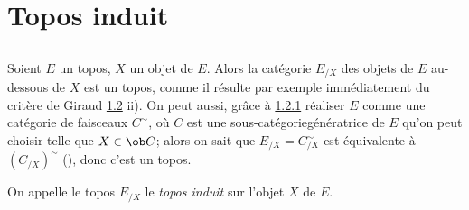 \documentclass[10pt]{../fichiers-configuration-latex/smfart}
\begin{document}
\section{Topos induit}

\subsection{}
Soient $E$ un topos, $X$ un objet de $E$. Alors la catégorie
$E_{/X}$ des objets de $E$ au-dessous de $X$ est un topos, comme il
résulte par exemple immédiatement du critère de Giraud
\hyperref[IV.theo1.2]{1.2} ii). On peut aussi, grâce à \hyperref[IV.cor1.2.1]{1.2.1}
réaliser $E$ comme une catégorie de faisceaux $C^{\sim}$, où
$C$ est une sous-catégorie\pageoriginale génératrice de $E$
qu'on peut choisir telle que $X\in \ob C$; alors on sait que
$E_{/X}=C^{\sim}_{/X}$ est équivalente à $(C_{/X})^{\sim}$
(), donc c'est un topos.

On appelle le topos $E_{/X}$ le \emph{topos induit} sur l'objet $X$
de $E$.
\end{document}
